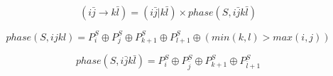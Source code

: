 \documentclass[./thesis.tex]{subfiles}
\begin{document}
\begin{equation}
(i\bar j \rightarrow k\bar l) = (i\bar j|k\bar l) \times phase(S,i\bar jk\bar l)
\end{equation}




\begin{equation}
phase(S,ijkl) = P^S_i \oplus P^S_j \oplus P^S_{k+1} \oplus P^S_{l+1} \oplus (min(k,l)>max(i,j))
\end{equation}


\begin{equation}
phase(S,i\bar jk\bar l) = P^S_i \oplus P^S_{\bar j} \oplus P^S_{k+1} \oplus P^S_{\bar l+1}
\end{equation}

\newcommand{\Gpq}{G_{pq}}
\newcommand{\Gpbq}{G_{p \bar q}}
\end{document}
